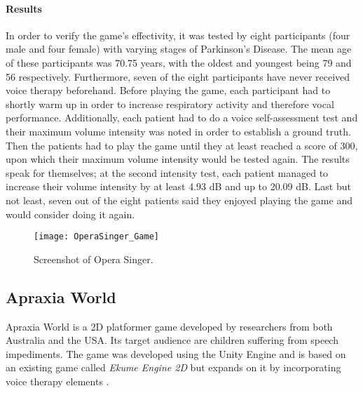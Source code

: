 \documentclass[draft,final]{vutinfth} %
\begin{document}
\paragraph{Results}
In order to verify the game's effectivity, it was tested by eight participants (four male and four female) with varying stages of Parkinson's Disease. The mean age of these participants was 70.75 years, with the oldest and youngest being 79 and 56 respectively. Furthermore, seven of the eight participants have never received voice therapy beforehand.
Before playing the game, each participant had to shortly warm up in order to increase respiratory activity and therefore  vocal performance. Additionally, each patient had to do a voice self-assessment test and their maximum volume intensity was noted in order to establish a ground truth. Then the patients had to play the game until they at least reached a score of 300, upon which their maximum volume intensity would be tested again.
The results speak for themselves; at the second intensity test, each patient managed to increase their volume intensity by at least 4.93 dB and up to 20.09 dB. Last but not least, seven out of the eight patients said they enjoyed playing the game and would consider doing it again.
\begin{figure}
\begin{center}
\texttt{[image: OperaSinger\_Game]}
\end{center}
\caption{Screenshot of Opera Singer\cite{ParkinsonGame}.}
\end{figure}
\subsection{Apraxia World}
Apraxia World is a 2D platformer game developed by researchers from both Australia and the USA. Its target audience are children suffering from speech impediments. The game was developed using the Unity Engine and is based on an existing game called \emph{Ekume Engine 2D} but expands on it by incorporating voice therapy elements \cite{hair2021longitudinal}.
\end{document}
